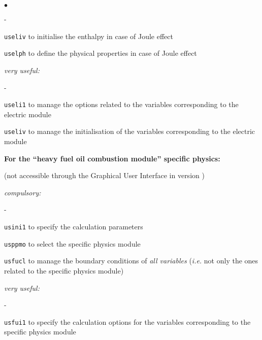 {{{\begin{list}{$\bullet$}{}
\begin{list}{}{}
\begin{list}{}{}
\begin{list}{-}{}
            \item \texttt{useliv} to initialise the enthalpy in
                  case of Joule effect

            \item \texttt{uselph} to define the physical
                  properties in case of Joule effect
        \end{list}

        \item {\em very useful:}
        \begin{list}{-}{}
            \item  \texttt{useli1} to manage the options related
                   to the variables corresponding to the electric module

            \item   \texttt{useliv} to manage the initialisation of the
                   variables corresponding to the electric module
        \end{list}
    \end{list}

     \item{\bf For the ``heavy fuel oil combustion module'' specific physics:}

(not accessible through the Graphical User Interface in version \verscs)
    \begin{list}{}{}
        \item {\em compulsory:}
        \begin{list}{-}{}
            \item \texttt{usini1} to specify the calculation parameters

            \item \texttt{usppmo} to select the specific physics module

            \item \texttt{usfucl} to manage the
                  boundary conditions of {\em all variables} ({\em i.e.} not only
              the ones related to the specific physics module)
        \end{list}

        \item {\em very useful:}
        \begin{list}{-}{}
            \item  \texttt{usfui1}
               to specify the calculation options
                   for the variables
                   corresponding to the specific physics module


\end{list}
\end{list}
\end{list}
\end{list}}}}
